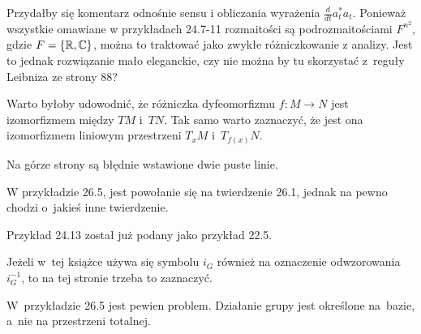 \documentclass[a4paper,11pt]{article}
\begin{document}
\vspace{\spaceFour}



\start {} Przydałby się komentarz odnośnie sensu i obliczania
wyrażenia $\frac{ d }{ dt } a^{ * }_{ t } a_{ t }$. Ponieważ wszystkie
omawiane w przykładach 24.7-11 rozmaitości są podrozmaitościami
$F^{ n^{ 2 } }$, gdzie $F = \{ \mathbb{R}, \mathbb{C} \}$, można
to traktować jako zwykłe różniczkowanie z analizy. Jest to jednak
rozwiązanie mało eleganckie, czy nie można by tu skorzystać z~reguły
Leibniza ze strony 88?

\vspace{\spaceFour}



\start Warto byłoby udowodnić, że różniczka dyfeomorfizmu
$f : M \to N$ jest izomorfizmem między $TM$ i~$TN$. Tak samo warto
zaznaczyć, że jest ona izomorfizmem liniowym przestrzeni $T_{ x }M$
i~$T_{ f( x ) }N$.

\vspace{\spaceFour}



\start {} Na górze strony są błędnie wstawione dwie puste
linie.

\vspace{\spaceFour}



\start {} W przykładzie 26.5, jest powołanie się na twierdzenie
26.1, jednak na pewno chodzi o~jakieś inne twierdzenie.

\vspace{\spaceFour}



\start {} Przykład 24.13 został już podany jako przykład 22.5.

\vspace{\spaceFour}



\start {} Jeżeli w~tej książce używa się symbolu $i_{ G }$
również na oznaczenie odwzorowania $i_{ G }^{ -1 }$, to na tej stronie
trzeba to zaznaczyć.

\vspace{\spaceFour}



\start {} W~przykładzie 26.5 jest pewien problem. Działanie
grupy jest określone na~bazie, a~nie na przestrzeni totalnej.

\vspace{\spaceFour}
\end{document}
